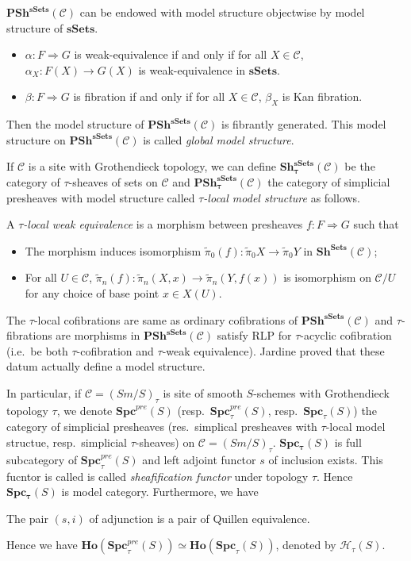 \documentclass[b5paper,10pt]{article}
\begin{document}
$\mathbf{PSh^{sSets}}(\mathcal{C})$ can be endowed with model structure objectwise by model structure of $\mathbf{sSets}$.
\begin{itemize}
	\item $\alpha \colon F \Rightarrow G$ is weak-equivalence if and only if for all $X \in \mathcal{C}$, $\alpha_X: F(X) \to G(X)$ is weak-equivalence in $\mathbf{sSets}$.
	\item $\beta\colon F \Rightarrow G$ is fibration if and only if for all $X \in \mathcal{C}$, $\beta_X$ is Kan fibration.
\end{itemize}
Then the model structure of $\mathbf{PSh^{sSets}}(\mathcal{C})$ is fibrantly generated. This model structure on $\mathbf{PSh^{sSets}}(\mathcal{C})$ is called \emph{global model structure}.

If $\mathcal{C}$ is a site with Grothendieck topology, we can define $\mathbf{Sh^{sSets}_\tau} (\mathcal{C})$ be the category of $\tau$-sheaves of sets on $\mathcal{C}$ and $\mathbf{PSh_\tau^{sSets}}(\mathcal{C})$ the category of simplicial presheaves with model structure called \emph{$\tau$-local model structure} as follows. 
\begin{secdefn}
	A \emph{$\tau$-local weak equivalence} is a morphism between presheaves $f \colon F \Rightarrow G$ such that
	\begin{itemize}
		\item The morphism induces isomorphism $\tilde{\pi}_0(f): \tilde{\pi}_0X \to \tilde{\pi}_0Y$ in $\mathbf{Sh^{Sets}}(\mathcal{C})$;
		\item For all $U \in \mathcal{C}$, $\tilde{\pi}_n(f): \tilde{\pi}_n(X,x) \to \tilde{\pi}_n(Y,f(x))$ is isomorphism on $\mathcal{C}/U$ for any choice of base point $x \in X(U)$.
	\end{itemize}
\end{secdefn}
The $\tau$-local cofibrations are same as ordinary cofibrations of $\mathbf{PSh^{sSets}}(\mathcal{C})$ and $\tau$-fibrations are morphisms in $\mathbf{PSh^{sSets}}(\mathcal{C})$ satisfy RLP for $\tau$-acyclic cofibration (i.e.\ be both $\tau$-cofibration and $\tau$-weak equivalence). Jardine proved that these datum actually define a model structure.

In particular, if $\mathcal{C}=(Sm/S)_\tau$ is site of smooth $S$-schemes with Grothendieck topology $\tau$, we denote $\mathbf{Spc}^{pre}(S)$ (resp.\ $\mathbf{Spc}_\tau^{pre}(S)$, resp.\ $\mathbf{Spc}_\tau(S)$) the category of simplicial presheaves (res.\ simplical presheaves with $\tau$-local model structue, resp.\ simplicial $\tau$-sheaves) on $\mathcal{C}=(Sm/S)_\tau$. $\mathbf{Spc_\tau}(S)$ is full subcategory of $\mathbf{Spc}^{pre}_\tau(S)$ and left adjoint functor $s$ of inclusion exists. This fucntor is called is called \emph{sheafification functor} under topology $\tau$. Hence $\mathbf{Spc_\tau}(S)$ is model category. Furthermore, we have 
\begin{secprop}
	The pair $(s ,i)$ of adjunction is a pair of Quillen equivalence.
\end{secprop}
Hence we have $\mathbf{Ho}(\mathbf{Spc}_\tau^{pre}(S)) \simeq \mathbf{Ho}(\mathbf{Spc}_\tau(S))$, denoted by $\mathcal{H}_\tau(S)$.
\end{document}
